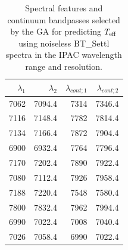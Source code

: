 \begin{table}
\begin{center}
\begin{tabular}{rrrr}
  \hline
  $\lambda_1$ & $\lambda_2$ & $\lambda_{cont;1}$ & $\lambda_{cont;2} $ \\ 
  \hline 
  
7062 & 7094.4 &	7314 & 7346.4 \\
7116 & 7148.4 &	7782 & 7814.4 \\
7134 & 7166.4 &	7872 & 7904.4 \\
6900 & 6932.4 &	7764 & 7796.4 \\
7170 & 7202.4 &	7890 & 7922.4 \\
7080 & 7112.4 &	7926 & 7958.4 \\
7188 & 7220.4 &	7548 & 7580.4 \\
7800 & 7832.4 &	7962 & 7994.4 \\
6990 & 7022.4 &	7008 & 7040.4 \\
7026 & 7058.4 &	6990 & 7022.4 \\

\hline
\end{tabular}
\caption {Spectral features and continuum bandpasses selected by the
  GA for predicting $T_{\rm eff}$ using noiseless BT\_Settl spectra in
  the IPAC wavelength range and
  resolution.} \label{tab:ipac-teff-noiseless}
\end{center}
\end{table}


